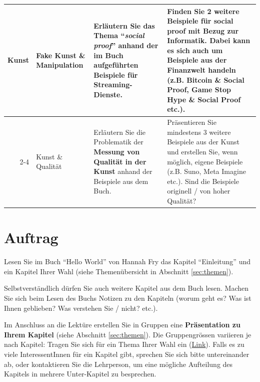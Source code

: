 \begin{landscape}
\begin{longtable}{@{}r|p{5.3cm}||p{10cm}|p{10cm}@{}}
		\multirow{2}{*}{\textbf{Kunst}}        & Fake Kunst \& Manipulation            & Erläutern Sie das Thema \textbf{\enquote{\textit{social proof}}} anhand der im Buch aufgeführten Beispiele für Streaming-Dienste.                                                                                                                                                                                                                                                          & Finden Sie 2 weitere Beispiele für social proof mit Bezug zur Informatik. Dabei kann es sich auch um Beispiele aus der Finanzwelt handeln (z.B. Bitcoin \& Social Proof, Game Stop Hype \& Social Proof etc.).                                                                   \\\cmidrule(l){2-4}
		                              & Kunst \& Qualität                     & Erläutern Sie die Problematik der \textbf{Messung von Qualität in der Kunst} anhand der Beispiele aus dem Buch.                                                                                                                                                                                                                                                                      & Präsentieren Sie mindestens 3 weitere Beispiele aus der Kunst und erstellen Sie, wenn möglich, eigene Beispiele (z.B. Suno, Meta Imagine etc.). Sind die Beispiele originell / von hoher Qualität?                                                                               \\
	\end{longtable}

\end{landscape}


\restoregeometry
\pagestyle{fancy}
\newpage
\section{Auftrag}
Lesen Sie im Buch \enquote{Hello World} von Hannah Fry das Kapitel \enquote{Einleitung} und ein Kapitel Ihrer Wahl (siehe Themenübersicht in Abschnitt \ref{sec:themen}).

Selbstverständlich dürfen Sie auch weitere Kapitel aus dem Buch lesen. Machen Sie sich beim Lesen des Buchs Notizen zu den Kapiteln (worum geht es? Was ist Ihnen geblieben? Was verstehen Sie / nicht? etc.).

Im Anschluss an die Lektüre erstellen Sie in Gruppen eine \textbf{Präsentation zu Ihrem Kapitel} (siehe Abschnitt \ref{sec:themen}). Die Gruppengrössen variieren je nach Kapitel: Tragen Sie sich für ein Thema Ihrer Wahl ein (\href{https://eduzh-my.sharepoint.com/:x:/g/personal/cyril_wendl_edu_zh_ch/EScHfDarDeVHhAJB3WPCghsBYa63XpdaEkcrZk5dOiQiVA?e=kHy0bM}{Link}). Falls es zu viele InteressentInnen für ein Kapitel gibt, sprechen Sie sich bitte untereinander ab, oder kontaktieren Sie die Lehrperson, um eine mögliche Aufteilung des Kapitels in mehrere Unter-Kapitel zu besprechen.

